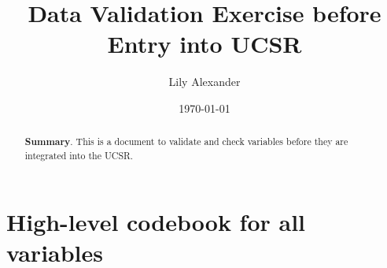 \documentclass{article}
\begin{document}
\title{Data Validation Exercise before Entry into UCSR}\author{
Lily Alexander
}

\date{
\bigskip
\today
}

\maketitle

\begin{abstract}
\textbf{Summary}. This is a document to validate and check variables before they are integrated into the UCSR.
\end{abstract}

\section{High-level codebook for all variables}
\end{document}
